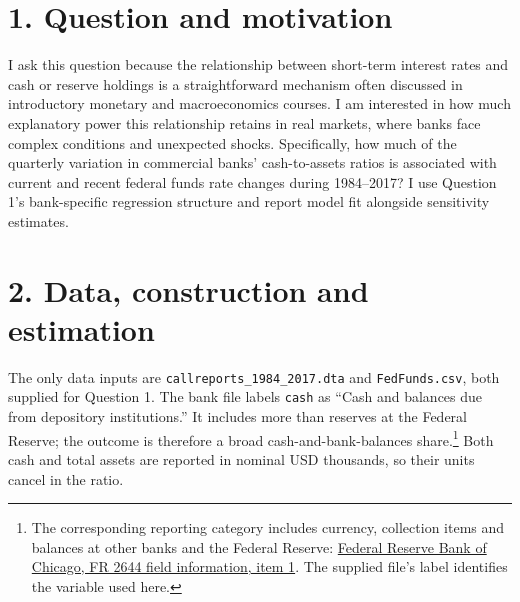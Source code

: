 \documentclass[10pt]{article}
\begin{document}
\section*{1. Question and motivation}
I ask this question because the relationship between short-term interest rates and cash or reserve holdings is a straightforward mechanism often discussed in introductory monetary and macroeconomics courses. I am interested in how much explanatory power this relationship retains in real markets, where banks face complex conditions and unexpected shocks. Specifically, how much of the quarterly variation in commercial banks' cash-to-assets ratios is associated with current and recent federal funds rate changes during 1984--2017? I use Question 1's bank-specific regression structure and report model fit alongside sensitivity estimates.

\section*{2. Data, construction and estimation}
The only data inputs are \texttt{callreports\_1984\_2017.dta} and \texttt{FedFunds.csv}, both supplied for Question 1. The bank file labels \texttt{cash} as ``Cash and balances due from depository institutions.'' It includes more than reserves at the Federal Reserve; the outcome is therefore a broad cash-and-bank-balances share.\footnote{The corresponding reporting category includes currency, collection items and balances at other banks and the Federal Reserve: \href{https://www.chicagofed.org/banking/financial-institution-reports/fr2644-field-information}{Federal Reserve Bank of Chicago, FR 2644 field information, item 1}. The supplied file's label identifies the variable used here.} Both cash and total assets are reported in nominal USD thousands, so their units cancel in the ratio.
\end{document}

